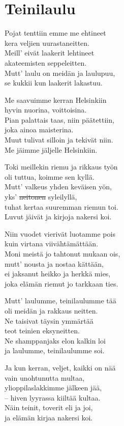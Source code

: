 
\section*{\centering \textbf{Teinilaulu}}
Pojat tenttiin emme me ehtineet\\
kera veljien uurastaneitten.\\
Meill' eivät laakerit lehtineet\\
akateemisten seppeleitten.\\
Mutt' laulu on meidän ja laulupuu,\\
se kukkii kun laakerit lakastuu.

Me saavuimme kerran Helsinkiin\\
hyvin nuorina, voittoisina.\\
Pian palattais taas, niin päätettiin,\\
joka ainoa maisterina.\\
Muut tulivat silloin ja tekivät niin.\\
Me jäimme jäljelle Helsinkiin.

Toki meillekin riemu ja rikkaus työn\\
oli tuttua, koimme sen kyllä.\\
Mutt' valkeus yhden keväisen yön,\\
yks' \sout{neitonen} syleilyllä,\\
tuhat kertaa suuremman riemun toi.\\
Luvut jäivät ja kirjoja nakersi koi.

Niin vuodet vierivät luotamme pois\\
kuin virtana viivähtämättään.\\
Moni meistä jo tahtonut mukaan ois,\\
mutt' nousta ja nostaa kättään,\\
ei jaksanut heikko ja herkkä mies,\\
joka elämän riemut jo tarkkaan ties.

Mutt' laulumme, teinilaulumme tää\\
oli meidän ja rakkaus neitten.\\
Ne taisivat täysin ymmärtää\\
teot teinien eksyneitten.\\
Ne shamppanjaks elon kalkin loi\\
ja laulumme, teinilaulumme soi.

Ja kun kerran, veljet, kaikki on nää\\
vain unohtunutta multaa,\\
ylioppilaslakkimme jälkeen jää,\\
– hiven lyyrassa kiiltää kultaa.\\
Näin teinit, toverit eli ja joi,\\
ja elämän kirjaa nakersi koi.